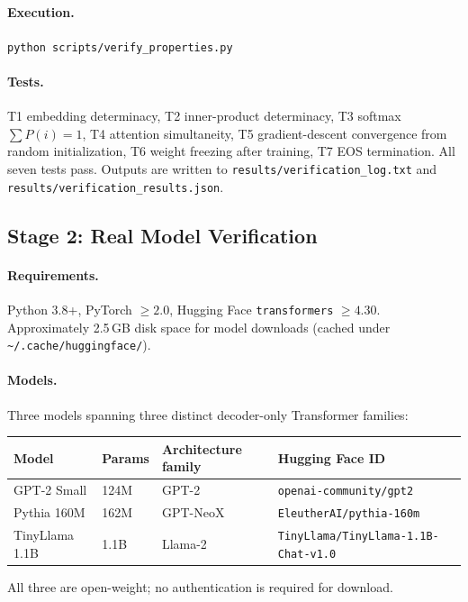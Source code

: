 \documentclass[a4paper,twocolumn,11pt]{article}
\begin{document}
\paragraph{Execution.}  \texttt{python scripts/verify\_properties.py}

\paragraph{Tests.}  T1 embedding determinacy, T2 inner-product determinacy, T3 softmax $\sum P(i) = 1$, T4 attention simultaneity, T5 gradient-descent convergence from random initialization, T6 weight freezing after training, T7 EOS termination. All seven tests pass. Outputs are written to \texttt{results/verification\_log.txt} and \texttt{results/verification\_results.json}.

\subsection{Stage 2: Real Model Verification}
\label{sec:B3}

\paragraph{Requirements.}  Python 3.8+, PyTorch $\geq 2.0$, Hugging Face \texttt{transformers} $\geq 4.30$. Approximately 2.5\,GB disk space for model downloads (cached under \texttt{\~{}/.cache/huggingface/}).

\paragraph{Models.}  Three models spanning three distinct decoder-only Transformer families:

\begin{center}
\begin{tabular}{@{}llll@{}}
\toprule
Model & Params & Architecture family & Hugging Face ID \\
\midrule
GPT-2 Small & 124M & GPT-2 & \texttt{openai-community/gpt2} \\
Pythia 160M & 162M & GPT-NeoX & \texttt{EleutherAI/pythia-160m} \\
TinyLlama 1.1B & 1.1B & Llama-2 & \texttt{TinyLlama/TinyLlama-1.1B-Chat-v1.0} \\
\bottomrule
\end{tabular}
\end{center}

All three are open-weight; no authentication is required for download.
\end{document}
